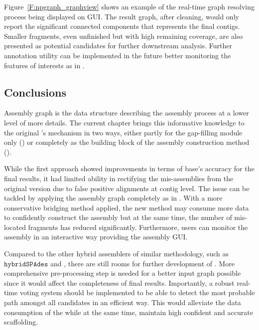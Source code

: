 Figure~\ref{F:npgraph_graphview} shows an example of the real-time graph resolving process being displayed on GUI.
The result graph, after cleaning, would only report the significant connected components that represents the final contigs.
Smaller fragments, even unfinished but with high remaining coverage, are also presented as potential candidates for further downstream analysis.
Further annotation utility can be implemented in the future better monitoring the features of interests as in \npscarf{}.
\subsection{Conclusions}
Assembly graph is the data structure describing the assembly process at a lower level of more details.
The current chapter brings this informative knowledge to the original \npscarf{}'s mechanism in two ways, either partly for the gap-filling module only (\npscarfg{}) or completely as the building block of the assembly construction method (\npgraph{}).

While the first approach showed improvements in terms of base's accuracy for the final results, it had limited ability in rectifying the mis-assemblies from the original version due to false positive alignments at contig level.
The issue can be tackled by applying the assembly graph completely as in \npgraph{}.
With a more conservative bridging method applied, the new method may consume more data to confidently construct the assembly but at the same time, the number of mis-located fragments has reduced significantly.
Furthermore, users can monitor the assembly in an interactive way providing the assembly GUI.

Compared to the other hybrid assemblers of similar methodology, such as $\mathtt{hybridSPAdes}$ and \unicycler{}, there are still rooms for further development of \npgraph{}. 
More comprehensive pre-processing step is needed for a better input graph possible since it would affect the completeness of final results. 
Importantly, a robust real-time voting system should be implemented to be able to detect the most probable path amongst all candidates in an efficient way.
This would alleviate the data consumption of the \npgraph{} while at the same time, maintain high confident and accurate scaffolding. 